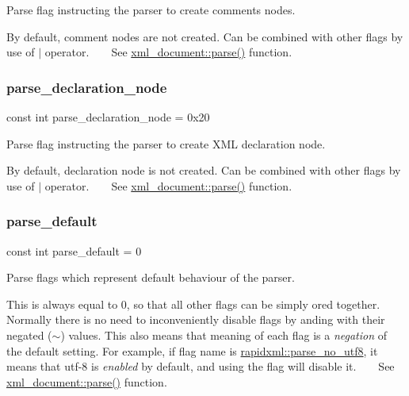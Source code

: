 Parse flag instructing the parser to create comments nodes. 

By default, comment nodes are not created. Can be combined with other flags by use of $\vert$ operator. ~\newline
~\newline
 See \mbox{\hyperlink{classrapidxml_1_1xml__document_aa280fd704731128b4556b41c1e9182b8}{xml\+\_\+document\+::parse()}} function. \mbox{\label{namespacerapidxml_a52e2c934ad9c845a5f4cc49570470556}} 
\subsubsection{\texorpdfstring{parse\+\_\+declaration\+\_\+node}{parse\_declaration\_node}}
{\footnotesize\ttfamily const int parse\+\_\+declaration\+\_\+node = 0x20}



Parse flag instructing the parser to create X\+ML declaration node. 

By default, declaration node is not created. Can be combined with other flags by use of $\vert$ operator. ~\newline
~\newline
 See \mbox{\hyperlink{classrapidxml_1_1xml__document_aa280fd704731128b4556b41c1e9182b8}{xml\+\_\+document\+::parse()}} function. \mbox{\label{namespacerapidxml_a45751cf2f38fd6915f35b3122b46d5b6}} 
\subsubsection{\texorpdfstring{parse\+\_\+default}{parse\_default}}
{\footnotesize\ttfamily const int parse\+\_\+default = 0}



Parse flags which represent default behaviour of the parser. 

This is always equal to 0, so that all other flags can be simply ored together. Normally there is no need to inconveniently disable flags by anding with their negated ($\sim$) values. This also means that meaning of each flag is a {\itshape negation} of the default setting. For example, if flag name is \mbox{\hyperlink{namespacerapidxml_accde57f6054857ee4042a1b4d98c83b9}{rapidxml\+::parse\+\_\+no\+\_\+utf8}}, it means that utf-\/8 is {\itshape enabled} by default, and using the flag will disable it. ~\newline
~\newline
 See \mbox{\hyperlink{classrapidxml_1_1xml__document_aa280fd704731128b4556b41c1e9182b8}{xml\+\_\+document\+::parse()}} function. \mbox{\label{namespacerapidxml_a8e187746ba1ca04f107951ad32df962e}} 

